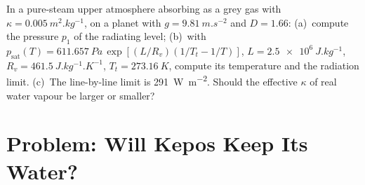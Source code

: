 \begin{exercise}[$\star\star\star$]\label{exo:b3:planetary-atmospheres:12}
In a pure-steam upper atmosphere absorbing as a grey gas with $\kappa =
\qty{0.005}{m^2.kg^{-1}}$, on a planet with $g = \qty{9.81}{m.s^{-2}}$
and $D = 1.66$: (a)~compute the pressure $p_1$ of the radiating level;
(b)~with $p_\mathrm{sat}(T) = \qty{611.657}{Pa}\,\exp[(L/R_v)(1/T_t -
1/T)]$, $L = \qty{2.5e6}{J.kg^{-1}}$, $R_v = \qty{461.5}{J.kg^{-1}.K^{-1}}$,
$T_t = \qty{273.16}{K}$, compute its temperature and the radiation limit.
(c)~The line-by-line limit is \qty{291}{W.m^{-2}}. Should the effective
$\kappa$ of real water vapour be larger or smaller?
\end{exercise}

\section{Problem: Will Kepos Keep Its Water?}

